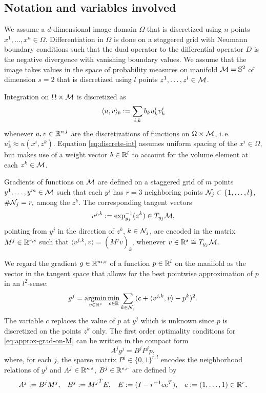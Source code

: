 
\subsection{Notation and variables involved}

We assume a $d$-dimensional image domain $\Omega$ that is discretized using
$n$ points $x^1, \dots, x^n \in \Omega$.
Differentiation in $\Omega$ is done on a staggered grid with Neumann boundary
conditions such that the dual operator to the differential operator $D$ is the
negative divergence with vanishing boundary values.
We assume that the image takes values in the space of
probability measures on manifold $\mathcal{M} = \mathbb{S}^2$ of dimension $s=2$ that is
discretized using $l$ points $z^1, \dots, z^l \in \mathcal{M}$. 

Integration on $\Omega \times \mathcal{M}$ is discretized as
\begin{equation}\label{eq:discrete-int}
    \langle u, v \rangle_b := \sum_{i,k} b_{k} u_k^i v_k^i
    \vspace{-7.5pt}
\end{equation}
whenever $u,v \in \mathbb{R}^{n,l}$ are the discretizations of functions on
$\Omega \times \mathcal{M}$, i.\,e. $u_k^i \approx u(x^i,z^k)$.
Equation \eqref{eq:discrete-int} assumes uniform spacing of the $x^i \in \Omega$,
but makes use of a weight vector $b \in \mathbb{R}^l$ to account for the volume element
at each $z^k \in \mathcal{M}$.

Gradients of functions on $\mathcal{M}$ are defined on a staggered grid of $m$ points
$y^1, \dots, y^m \in \mathcal{M}$ such that each $y^j$ has $r=3$ neighboring points $
    \mathcal{N}_j \subset \{1, \dots, l\}$, $\#\mathcal{N}_j = r,
$ among the $z^k$.
The corresponding tangent vectors
\begin{equation}
    v^{j,k} := \exp^{-1}_{y_j}(z^k) \in T_{y_j}\mathcal{M},
\end{equation}
pointing from $y^j$ in the direction of $z^k$, $k \in \mathcal{N}_j$, are encoded in
the matrix $M^j \in \mathbb{R}^{r,s}$ such that $
    \langle v^{j,k}, v \rangle = (M^j v)_k
$, whenever $v \in \mathbb{R}^s \cong T_{y_j}\mathcal{M}$.

We regard the gradient $g \in \mathbb{R}^{m,s}$ of a function $p \in \mathbb{R}^{l}$ on the
manifold as the vector in the tangent space that allows for the best pointwise
approximation of $p$ in an $l^2$-sense:
\begin{equation}\label{eq:approx-grad-on-M}
    g^j = \argmin_{v \in \IR^s} \min_{c \in \IR} \sum_{k \in \nbhd_j} (
        c + \langle v^{j,k}, v \rangle - p^k
    )^2.
\end{equation}
The variable $c$ replaces the value of $p$ at $y^j$ which is unknown since $p$
is discretized on the points $z^k$ only.
The first order optimality conditions for \eqref{eq:approx-grad-on-M} can be
written in the compact form
\begin{equation}
    A^j g^j = B^j P^j p,
\end{equation}
where, for each $j$, the sparse matrix $P^j \in \{0,1\}^{r,l}$ encodes the neighborhood
relations of $y^j$ and $A^j \in \mathbb{R}^{s,s}$, $B^j \in \mathbb{R}^{s,r}$ are defined by
\begin{align}
    A^j := B^j M^j, &&
    B^j := {M^j}^T E, &&
    E := (I - r^{-1} ee^T), &&
    e := (1, \dots, 1) \in \mathbb{R}^r.
\end{align}

